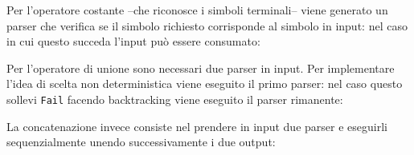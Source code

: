 \documentclass[12pt,a4paper]{report}
\begin{document}
Per l'operatore costante --che riconosce i simboli terminali-- viene
generato un parser che verifica se il simbolo richiesto corrisponde al
simbolo in input: nel caso in cui questo succeda l'input può essere
consumato:

\begin{Shaded}
\begin{Highlighting}[]
\NormalTok{ =}
  \NormalTok{ (}
\end{Highlighting}
\end{Shaded}

Per l'operatore di unione sono necessari due parser in input. Per
implementare l'idea di scelta non deterministica viene eseguito il primo
parser: nel caso questo sollevi \texttt{Fail} facendo backtracking viene
eseguito il parser rimanente:

\begin{Shaded}
\begin{Highlighting}[]
\NormalTok{= }
\end{Highlighting}
\end{Shaded}

La concatenazione invece consiste nel prendere in input due parser e
eseguirli sequenzialmente unendo successivamente i due output:

\begin{Shaded}
\begin{Highlighting}[]
\NormalTok{ = }
\end{Highlighting}
\end{Shaded}
\end{document}
